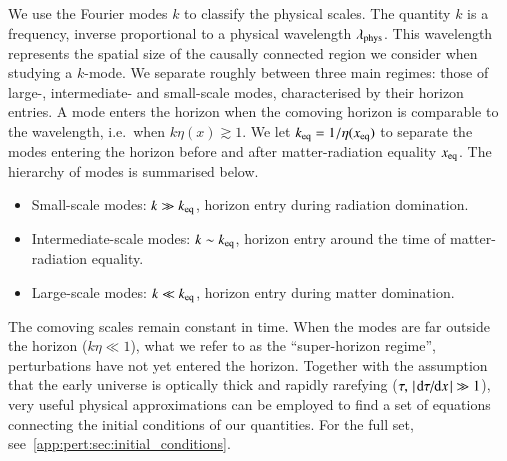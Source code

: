     We use the Fourier modes $k$ to classify the physical scales. The quantity $k$ is a frequency, inverse proportional to a physical wavelength $\lambda_\mathrm{phys}$. This wavelength represents the spatial size of the causally connected region we consider when studying a $k$-mode. We separate roughly between three main regimes: those of large-, intermediate- and small-scale modes, characterised by their horizon entries. A mode enters the horizon when the comoving horizon is comparable to the wavelength, i.e.\ when $k\eta(x) \gtrsim 1$. We let $k_\mathrm{eq}= 1/\eta(x_\mathrm{eq})$ to separate the modes entering the horizon before and after matter-radiation equality $x_\mathrm{eq}$. The hierarchy of modes is summarised below.
    \begin{itemize}
        \item Small-scale modes: $k \gg k_\mathrm{eq}$, horizon entry during radiation domination.
        \item Intermediate-scale modes: $k \sim k_\mathrm{eq}$, horizon entry around the time of matter-radiation equality.
        \item Large-scale modes: $k \ll k_\mathrm{eq}$, horizon entry during matter domination.
    \end{itemize}

    The comoving scales remain constant in time. When the modes are far outside the horizon ($k\eta\ll 1$), what we refer to as the ``super-horizon regime'', perturbations have not yet entered the horizon. Together with the assumption that the early universe is optically thick and rapidly rarefying ($\tau,\, \abs{\dv*{\tau}{x}} \gg 1$), very useful physical approximations can be employed to find a set of equations connecting the initial conditions of our quantities. For the full set, see~\cref{app:pert:sec:initial_conditions}. 



